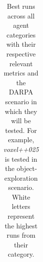 \begin{longtable}{|l|c|c|c|c|}
    

  

    \caption{Best runs across all agent categories with their respective relevant metrics and the DARPA scenario in which they will be tested. For example, \textit{voxel++025} is tested in the object-exploration scenario. White letters represent the highest runs from their category.
    } %
    \label{tab:results-darpa-candidates}
\end{longtable}


